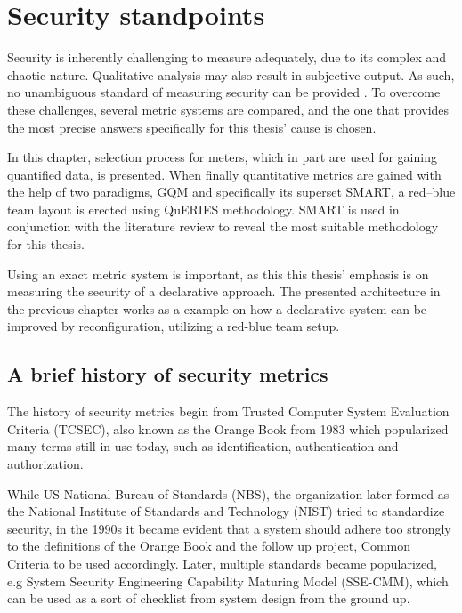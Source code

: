 \chapter{Security standpoints} \label{securitystandpoints}

Security is inherently challenging to measure adequately, due to its
complex and chaotic nature. Qualitative analysis may also result in
subjective output. As such, no unambiguous standard of measuring
security can be provided \cite{wang2005information}. To overcome these
challenges, several metric systems are compared, and the one that
provides the most precise answers specifically for this thesis' cause
is chosen.

In this chapter, selection process for meters, which in part are used
for gaining quantified data, is presented.  When finally quantitative
metrics are gained with the help of two paradigms, GQM and
specifically its superset SMART, a red–blue team layout is erected
using QuERIES methodology. SMART is used in conjunction with the
literature review to reveal the most suitable methodology for this
thesis.

Using an exact metric system is important, as this this thesis'
emphasis is on measuring the security of a declarative approach. The
presented architecture in the previous chapter works as a example on
how a declarative system can be improved by reconfiguration, utilizing
a red-blue team setup.

\section{A brief history of security metrics}

The history of security metrics begin from Trusted Computer System
Evaluation Criteria (TCSEC), also known as the Orange Book from 1983
which popularized many terms still in use today, such as
identification, authentication and
authorization. \cite{bayuk2013measuring}

While US National Bureau of Standards (NBS), the organization later
formed as the National Institute of Standards and Technology (NIST)
tried to standardize security, in the 1990s it became evident that a
system should adhere too strongly to the definitions of the Orange
Book and the follow up project, Common Criteria to be used
accordingly. Later, multiple standards became popularized, e.g System
Security Engineering Capability Maturing Model (SSE-CMM), which can be
used as a sort of checklist from system design from the ground
up. \cite{bayuk2013measuring}

